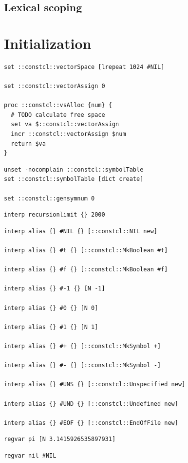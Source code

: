 \documentclass[twoside,9pt]{report}
\begin{document}
\section{Lexical scoping}
\label{lexical-scoping}
\chapter{Initialization}
\label{initialization}
\begin{lstlisting}
set ::constcl::vectorSpace [lrepeat 1024 #NIL]

set ::constcl::vectorAssign 0

proc ::constcl::vsAlloc {num} {
  # TODO calculate free space
  set va $::constcl::vectorAssign
  incr ::constcl::vectorAssign $num
  return $va
}
\end{lstlisting}
\begin{lstlisting}
unset -nocomplain ::constcl::symbolTable
set ::constcl::symbolTable [dict create]

set ::constcl::gensymnum 0
\end{lstlisting}
\begin{lstlisting}
interp recursionlimit {} 2000
\end{lstlisting}
\begin{lstlisting}
interp alias {} #NIL {} [::constcl::NIL new]

interp alias {} #t {} [::constcl::MkBoolean #t]

interp alias {} #f {} [::constcl::MkBoolean #f]

interp alias {} #-1 {} [N -1]

interp alias {} #0 {} [N 0]

interp alias {} #1 {} [N 1]

interp alias {} #+ {} [::constcl::MkSymbol +]

interp alias {} #- {} [::constcl::MkSymbol -]

interp alias {} #UNS {} [::constcl::Unspecified new]

interp alias {} #UND {} [::constcl::Undefined new]

interp alias {} #EOF {} [::constcl::EndOfFile new]
\end{lstlisting}
\begin{lstlisting}
regvar pi [N 3.1415926535897931]
\end{lstlisting}
\begin{lstlisting}
regvar nil #NIL
\end{lstlisting}
\end{document}
